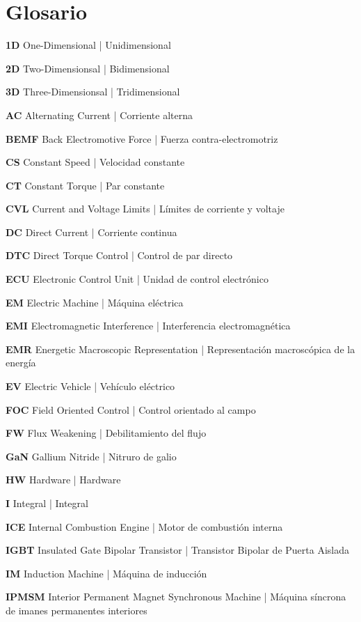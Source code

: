 \chapter*{Glosario}


\textbf{1D} One-Dimensional | Unidimensional

\textbf{2D} Two-Dimensionsal | Bidimensional

\textbf{3D} Three-Dimensionsal | Tridimensional

\textbf{AC} Alternating Current | Corriente alterna

\textbf{BEMF} Back Electromotive Force | Fuerza contra-electromotriz

\textbf{CS} Constant Speed | Velocidad constante

\textbf{CT} Constant Torque | Par constante

\textbf{CVL} Current and Voltage Limits | Límites de corriente y voltaje

\textbf{DC} Direct Current | Corriente continua

\textbf{DTC} Direct Torque Control | Control de par directo

\textbf{ECU} Electronic Control Unit | Unidad de control electrónico

\textbf{EM} Electric Machine | Máquina eléctrica

\textbf{EMI} Electromagnetic Interference | Interferencia electromagnética

\textbf{EMR} Energetic Macroscopic Representation | Representación macroscópica de la energía

\textbf{EV} Electric Vehicle | Vehículo eléctrico

\textbf{FOC} Field Oriented Control | Control orientado al campo

\textbf{FW} Flux Weakening | Debilitamiento del flujo

\textbf{GaN} Gallium Nitride | Nitruro de galio

\textbf{HW} Hardware | Hardware

\textbf{I} Integral | Integral

\textbf{ICE} Internal Combustion Engine | Motor de combustión interna

\textbf{IGBT} Insulated Gate Bipolar Transistor | Transistor Bipolar de Puerta Aislada

\textbf{IM} Induction Machine | Máquina de inducción

\textbf{IPMSM} Interior Permanent Magnet Synchronous Machine | Máquina síncrona de imanes permanentes interiores

